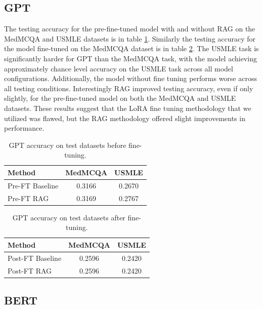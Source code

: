 \documentclass{article}
\begin{document}
\subsection{GPT}
The testing accuracy for the pre-fine-tuned model with and without RAG on the MedMCQA and USMLE datasets is in table \ref{tab:GPTmedmcqa_preft}. Similarly the testing accuracy for the model fine-tuned on the MedMCQA dataset is in table \ref{tab:GPTmedmcqa_postft}. The USMLE task is significantly harder for GPT than the MedMCQA task, with the model achieving approximately chance level accuracy on the USMLE task across all model configurations. Additionally, the model without fine tuning performs worse across all testing conditions. Interestingly RAG improved testing accuracy, even if only slightly, for the pre-fine-tuned model on both the MedMCQA and USMLE datasets. These results suggest that the LoRA fine tuning methodology that we utilized was flawed, but the RAG methodology offered slight improvements in performance.

\begin{table}[h]
    \centering
    \begin{tabular}{lcc}
        \hline
        \textbf{Method} & \textbf{MedMCQA} & \textbf{USMLE} \\
        \hline
        Pre-FT Baseline & 0.3166            & 0.2670          \\
        Pre-FT RAG      & 0.3169            & 0.2767          \\
        \hline
    \end{tabular}
    \caption{GPT accuracy on test datasets before fine-tuning.}
    \label{tab:GPTmedmcqa_preft}
\end{table}

\begin{table}[h]
    \centering
    \begin{tabular}{lcc}
        \hline
        \textbf{Method}  & \textbf{MedMCQA} & \textbf{USMLE} \\
        \hline
        Post-FT Baseline & 0.2596           & 0.2420          \\
        Post-FT RAG      & 0.2596            & 0.2420          \\
        \hline
    \end{tabular}
    \caption{GPT accuracy on test datasets after fine-tuning.}
    \label{tab:GPTmedmcqa_postft}
\end{table}

\subsection{BERT}
\end{document}
